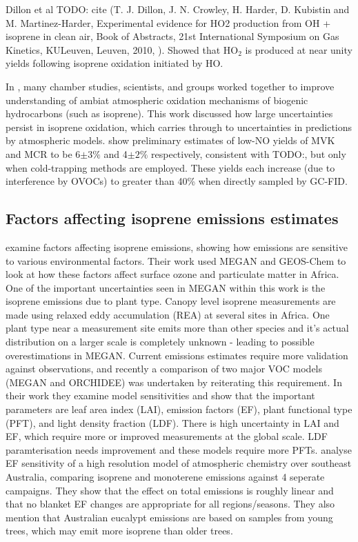     Dillon et al TODO: cite (T. J. Dillon, J. N. Crowley, H. Harder, D. Kubistin and M. Martinez-Harder, Experimental evidence for HO2 production from OH + isoprene in clean air, Book of Abstracts, 21st International Symposium on Gas Kinetics, KULeuven, Leuven, 2010, ).
    Showed that HO$_2$ is produced at near unity yields following isoprene oxidation initiated by HO.
    
    In \cite{Nguyen2014}, many chamber studies, scientists, and groups worked together to improve understanding of ambiat atmospheric oxidation mechanisms of biogenic hydrocarbons (such as isoprene). 
    This work discussed how large uncertainties persist in isoprene oxidation, which carries through to uncertainties in predictions by atmospheric models.
    \citet{Nguyen2014} show preliminary estimates of low-NO yields of MVK and MCR to be 6$\pm3\%$ and 4$\pm2\%$ respectively, consistent with TODO:\citet{Liu2013}, but only when cold-trapping methods are employed.
    These yields each increase (due to interference by OVOCs) to greater than 40\% when directly sampled by GC-FID.
  
  \subsection{Factors affecting isoprene emissions estimates}
    
    \citet{Marais2014} examine factors affecting isoprene emissions, showing how emissions are sensitive to various environmental factors.
    Their work used MEGAN \citep{Guenther1995} and GEOS-Chem to look at how these factors affect surface ozone and particulate matter in Africa.
    One of the important uncertainties seen in MEGAN within this work is the isoprene emissions due to plant type. 
    Canopy level isoprene measurements are made using relaxed eddy accumulation (REA) at several sites in Africa.
    One plant type near a measurement site emits more than other species and it's actual distribution on a larger scale is completely unknown - leading to possible overestimations in MEGAN.
    Current emissions estimates require more validation against observations, and recently a comparison of two major VOC models (MEGAN and ORCHIDEE) was undertaken by \cite{Messina2016} reiterating this requirement.
    In their work they examine model sensitivities and show that the important parameters are leaf area index (LAI), emission factors (EF), plant functional type (PFT), and light density fraction (LDF).
    There is high uncertainty in LAI and EF, which require more or improved measurements at the global scale.
    LDF paramterisation needs improvement and these models require more PFTs.
    \cite{Emmerson2016} analyse EF sensitivity of a high resolution model of atmospheric chemistry over southeast Australia, comparing isoprene and monoterene emissions against 4 seperate campaigns.
    They show that the effect on total emissions is roughly linear and that no blanket EF changes are appropriate for all regions/seasons.
    They also mention that Australian eucalypt emissions are based on samples from young trees, which may emit more isoprene than older trees.
    
